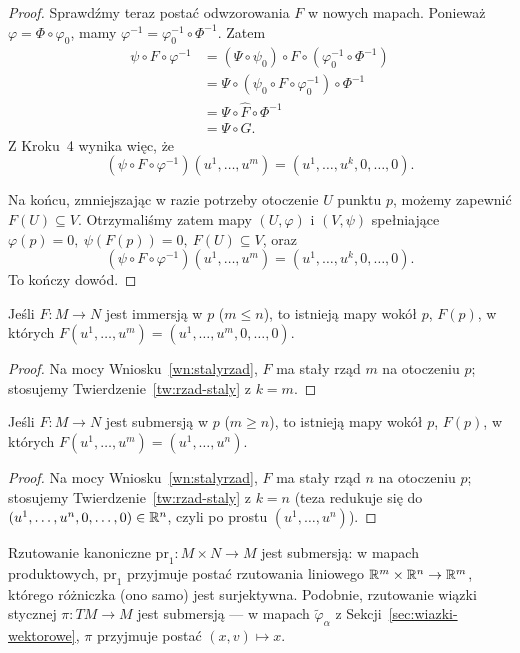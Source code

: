 \begin{proof}
Sprawdźmy teraz postać odwzorowania $F$ w nowych mapach.
Ponieważ $\varphi = \Phi\circ\varphi_0$,
mamy $\varphi^{-1} = \varphi_0^{-1}\circ\Phi^{-1}$.
Zatem
\begin{align*}
\psi\circ F\circ\varphi^{-1}
&=
(\Psi\circ\psi_0)
\circ F
\circ
(\varphi_0^{-1}\circ\Phi^{-1})\\
&=
\Psi
\circ
(\psi_0\circ F\circ\varphi_0^{-1})
\circ
\Phi^{-1}\\
&=
\Psi\circ\widehat F\circ\Phi^{-1}\\
&=
\Psi\circ G.
\end{align*}
Z Kroku~4 wynika więc, że
\[
(\psi\circ F\circ\varphi^{-1}) (u^1,\dots,u^m) = (u^1,\dots,u^k,0,\dots,0).
\]

Na końcu, zmniejszając w razie potrzeby otoczenie $U$ punktu $p$,
możemy zapewnić $F(U)\subseteq V$.
Otrzymaliśmy zatem mapy $(U,\varphi)$ i $(V,\psi)$ spełniające $\varphi(p)=0, \ \psi(F(p))=0, \ F(U)\subseteq V$,
oraz
\[
\boxed{ (\psi\circ F\circ\varphi^{-1})(u^1,\dots,u^m) = (u^1,\dots,u^k,0,\dots,0). }
\]
To kończy dowód.
\end{proof}

\begin{wniosek}\label{wn:immersja-lokalnie}
Jeśli $F\colon M\to N$ jest immersją w $p$ ($m\leq n$), to istnieją mapy wokół $p$, $F(p)$,
w których $F(u^1,\dots,u^m)=(u^1,\dots,u^m,0,\dots,0)$.
\end{wniosek}
\begin{proof}
Na mocy Wniosku~\ref{wn:stalyrzad}, $F$ ma stały rząd $m$ na otoczeniu $p$; stosujemy
Twierdzenie~\ref{tw:rzad-staly} z $k=m$.
\end{proof}

\begin{wniosek}\label{wn:submersja-lokalnie}
Jeśli $F\colon M\to N$ jest submersją w $p$ ($m\geq n$), to istnieją mapy wokół $p$, $F(p)$,
w których $F(u^1,\dots,u^m)=(u^1,\dots,u^n)$.
\end{wniosek}
\begin{proof}
Na mocy Wniosku~\ref{wn:stalyrzad}, $F$ ma stały rząd $n$ na otoczeniu $p$; stosujemy
Twierdzenie~\ref{tw:rzad-staly} z $k=n$ (teza redukuje się do $(u^1,\dots,u^n,0,\dots,0)\in
\mathbb{R}^n$, czyli po prostu $(u^1,\dots,u^n)$).
\end{proof}

\begin{przyklad}
Rzutowanie kanoniczne $\mathrm{pr}_1\colon M\times N\to M$ jest submersją: w mapach
produktowych, $\mathrm{pr}_1$ przyjmuje postać rzutowania liniowego $\mathbb{R}^m\times\mathbb{R}^n\to
\mathbb{R}^m$, którego różniczka (ono samo) jest surjektywna. Podobnie, rzutowanie wiązki
stycznej $\pi\colon TM\to M$ jest submersją — w mapach $\tilde\varphi_\alpha$ z Sekcji~\ref{sec:wiazki-wektorowe},
$\pi$ przyjmuje postać $(x,v)\mapsto x$.
\end{przyklad}
